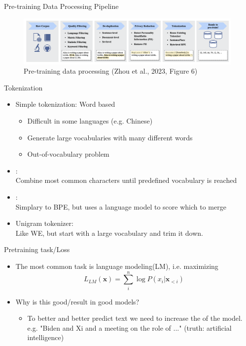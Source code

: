 \documentclass[10pt]{beamer}
\begin{document}
\begin{frame}{Pre-training Data Processing Pipeline}

\begin{figure}[h]
\centering
\includegraphics[width=0.99\textwidth]{fig/zhou_2023_fig6}
\caption{Pre-training data processing (Zhou et al., 2023, Figure 6)}
\end{figure}

\end{frame}



\begin{frame}{Tokenization}
\begin{itemize}
\item Simple tokenization: Word based
\pause
\begin{itemize}
\item Difficult in some languages (e.g. Chinese)
\pause
\item Generate large vocabularies with many different words
\pause
\item Out-of-vocabulary problem
\pause
\end{itemize}
\item {}: \\Combine most common characters until predefined vocabulary is reached
\pause
\item {}: \\Simplary to BPE, but uses a language model to score which to merge
\pause
\item Unigram tokenizer: \\Like WE, but start with a large vocabulary and trim it down.
\end{itemize}

\end{frame}

\begin{frame}{Pretraining task/Loss}

\begin{itemize}
\item The most common task is language modeling(LM), i.e. maximizing
\[
L_{LM}(\mathbf{x}) = \sum_i^n \log P(x_i | \mathbf{x}_{<i})
\]
\item Why is this good/result in good models?\pause
\begin{itemize}
\item To better and better predict text we need to increase the  of the model. \\ e.g. "Biden and Xi and a meeting on the role of ..." (truth: artificial intelligence)
\end{itemize}
\end{itemize}


\end{frame}
\end{document}
